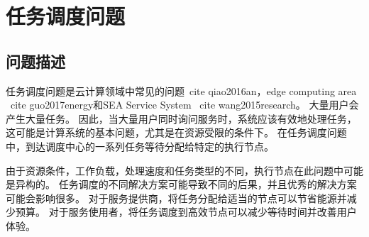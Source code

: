 \section{任务调度问题}\label{sec:task_scheduling_problems}
\subsection{问题描述}

任务调度问题是云计算领域中常见的问题\ cite {qiao2016an}，edge computing area \ cite {guo2017energy}和SEA Service System \ cite {wang2015research}。 大量用户会产生大量任务。 因此，当大量用户同时询问服务时，系统应该有效地处理任务，这可能是计算系统的基本问题，尤其是在资源受限的条件下。 在任务调度问题中，到达调度中心的一系列任务等待分配给特定的执行节点。

由于资源条件，工作负载，处理速度和任务类型的不同，执行节点在此问题中可能是异构的。 任务调度的不同解决方案可能导致不同的后果，并且优秀的解决方案可能会影响很多。 对于服务提供商，将任务分配给适当的节点可以节省能源并减少预算。 对于服务使用者，将任务调度到高效节点可以减少等待时间并改善用户体验。

